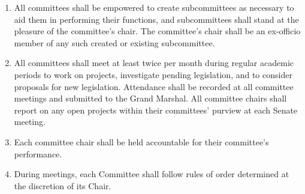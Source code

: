 \begin{enumerate}
    \item All committees shall be empowered to create subcommittees as necessary to aid them in performing their functions, and subcommittees shall stand at the pleasure of the committee's chair. The committee's chair shall be an ex-officio member of any such created or existing subcommittee.

    \item All committees shall meet at least twice per month during regular academic periods to work on projects, investigate pending legislation, and to consider proposals for new legislation. Attendance shall be recorded at all committee meetings and submitted to the Grand Marshal. All committee chairs shall report on any open projects within their committees' purview at each Senate meeting.

    \item Each committee chair shall be held accountable for their committee's performance.

    \item During meetings, each Committee shall follow rules of order determined at the discretion of its Chair.

    

    

    

    

    

    

    

    

    

\end{enumerate}
